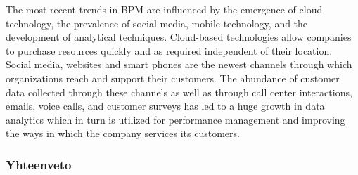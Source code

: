 \documentclass[finnish,12pt,a4paper,pdftex]{article}
\begin{document}











The most recent trends in BPM are influenced by the emergence of cloud technology, the prevalence of social media, mobile technology, and the development of analytical techniques. Cloud-based technologies allow companies to purchase resources quickly and as required independent of their location. Social media, websites and smart phones are the newest channels through which organizations reach and support their customers. The abundance of customer data collected through these channels as well as through call center interactions, emails, voice calls, and customer surveys has led to a huge growth in data analytics which in turn is utilized for performance management and improving the ways in which the company services its customers.


\subsubsection{Yhteenveto}

\end{document}
